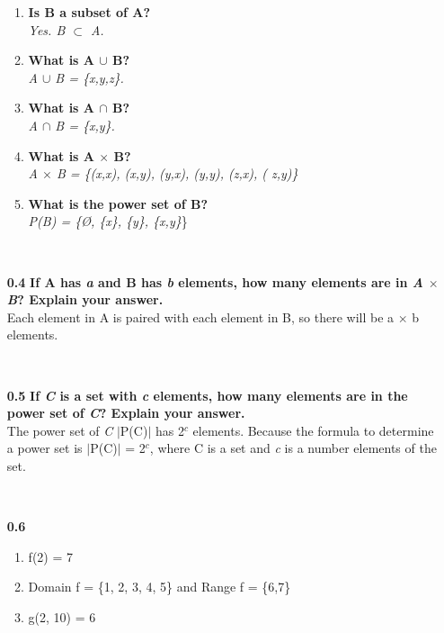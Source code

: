 \documentclass[12pt]{letter}
\begin{document}
\begin{enumerate}
\begin{enumerate}
	\item \textbf{Is B a subset of A?} \\
				\textit{Yes. B $\subset$ A.}

	\item \textbf{What is A $\cup$ B?} \\
				\textit{A $\cup$ B = \{x,y,z\}.}

	\item \textbf{What is A $\cap$ B?} \\
				\textit{A $\cap$ B = \{x,y\}.}

	\item \textbf{What is A $\times$ B?} \\
				\textit{A $\times$ B = \{(x,x), (x,y), (y,x), (y,y), (z,x), (					z,y)\}}
  \item \textbf{What is the power set of B?} \\
				\textit{P(B) = \{\O, \{x\}, \{y\}, \{x,y\}}\}
\end{enumerate}
\ \\ %
\item[\textbf{0.4}] \textbf{If A has \textit{a} and B has \textit{b} elements, how many elements are in \textit{A $\times$ B}? Explain your answer.}
\ \\ %
Each element in A is paired with each element in B, so there will be a $\times$ b elements.

\ \\ %
\item[\textbf{0.5}] \textbf{If \textit{C} is a set with \textit{c} elements, how many elements are in the power set of \textit{C}? Explain your answer.}
\ \\ %
The power set of \textit{C} $|$P(C)$|$ has 2$^c$ elements. Because the formula to determine a power set is $|$P(C)$|$ = 2$^c$, where C is a set and \textit{c} is a number elements of the set.

\ \\ %
\item[\textbf{0.6}]
\ \\ %
\begin{enumerate}
	\item f(2) = 7

	\item Domain f = \{1, 2, 3, 4, 5\} and Range f = \{6,7\}

	\item g(2, 10) = 6


\end{enumerate}
\end{enumerate}
\end{document}
